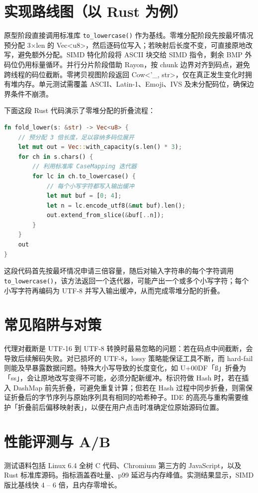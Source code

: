 \chapter{实现路线图（以 Rust 为例）}
原型阶段直接调用标准库 \texttt{to\_{}lowercase()} 作为基线。零堆分配阶段先按最坏情况预分配 3×len 的 Vec<u8>，然后逐码位写入；若映射后长度不变，可直接原地改写，避免额外分配。SIMD 特化阶段将 ASCII 块交给 SIMD 指令，剩余 BMP 外码位仍用标量循环。并行分片阶段借助 Rayon，按 chunk 边界对齐到码点，避免跨线程的码位截断。零拷贝视图阶段返回 Cow<'\_{}, str>，仅在真正发生变化时拥有堆内存。单元测试需覆盖 ASCII、Latin-1、Emoji、IVS 及未分配码位，确保边界条件不崩溃。\par
下面这段 Rust 代码演示了零堆分配的折叠流程：\par
\begin{lstlisting}[language=rust]
fn fold_lower(s: &str) -> Vec<u8> {
    // 预分配 3 倍长度，足以容纳多码位展开
    let mut out = Vec::with_capacity(s.len() * 3);
    for ch in s.chars() {
        // 利用标准库 CaseMapping 迭代器
        for lc in ch.to_lowercase() {
            // 每个小写字符都写入输出缓冲
            let mut buf = [0; 4];
            let n = lc.encode_utf8(&mut buf).len();
            out.extend_from_slice(&buf[..n]);
        }
    }
    out
}
\end{lstlisting}
这段代码首先按最坏情况申请三倍容量，随后对输入字符串的每个字符调用 \texttt{to\_{}lowercase()}，该方法返回一个迭代器，可能产出一个或多个小写字符；每个小写字符再编码为 UTF-8 并写入输出缓冲，从而完成零堆分配的折叠。\par
\chapter{常见陷阱与对策}
代理对截断是 UTF-16 到 UTF-8 转换时最易忽略的问题：若在码点中间截断，会导致后续解码失败。对已损坏的 UTF-8，lossy 策略能保证工具不断，而 hard-fail 则能及早暴露数据问题。特殊大小写导致的长度变化，如 U+00DF「ß」折叠为「ss」，会让原地改写变得不可能，必须分配新缓冲。标识符做 Hash 时，若在插入 DashMap 前先折叠，可避免重复计算；但若在 Hash 过程中同步折叠，则需保证折叠后的字节序列与原始序列具有相同的哈希种子。IDE 的高亮与重构需要维护「折叠前后偏移映射表」，以便在用户点击时准确定位原始源码位置。\par
\chapter{性能评测与 A/B}
测试语料包括 Linux 6.4 全树 C 代码、Chromium 第三方的 JavaScript，以及 Rust 标准库源码。指标涵盖吞吐量、p99 延迟与内存峰值。实测结果显示，SIMD 版比基线快 4 – 6 倍，且内存零增长。\par
